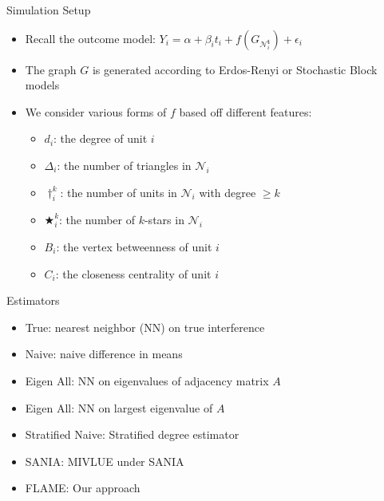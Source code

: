 \documentclass[newPxFont,numfooter,sectionpages]{beamer}
\begin{document}
\begin{frame}{Simulation Setup}
	\begin{itemize}
		\item Recall the outcome model: $Y_i = \alpha + \beta_i t_i + f(G_{\mathcal{N}_i^\mathbf{t}}) + \epsilon_i$
		\item The graph $G$ is generated according to Erdos-Renyi or Stochastic Block models
		\item We consider various forms of $f$ based off different features:
		\begin{itemize}
			\item $d_i$: the degree of unit $i$
   			 \item $\Delta_i$: the number of triangles in $\mathcal{N}_i$
   			 \item $\dagger_i^k$: the number of units in $\mathcal{N}_i$ with degree $\geq k$
 			 \item $\bigstar_i^k$: the number of $k$-stars in $\mathcal{N}_i$
   			 \item $B_i$: the vertex betweenness of unit $i$
    			\item $C_i$: the closeness centrality of unit $i$
		\end{itemize}
	\end{itemize}
\end{frame}
\begin{frame}{Estimators}
	\begin{itemize}
		\item True: nearest neighbor (NN) on true interference
		\item Naive: naive difference in means
		\item Eigen All: NN on eigenvalues of adjacency matrix $A$
		\item Eigen All: NN on largest eigenvalue of $A$
		\item Stratified Naive: Stratified degree estimator
		\item SANIA: MIVLUE under SANIA
		\item FLAME: Our approach
	\end{itemize}
\end{frame}
\end{document}
